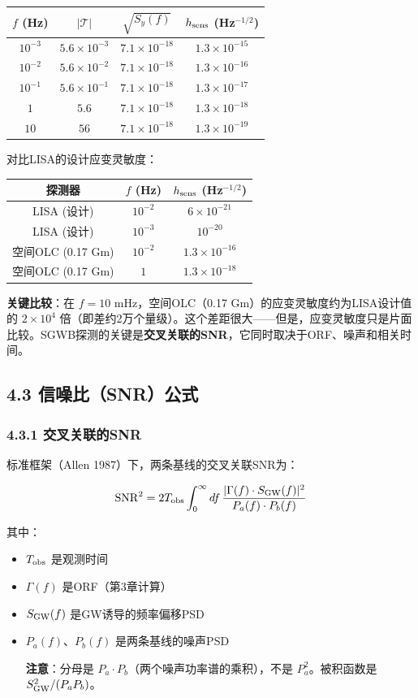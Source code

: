 \documentclass[12pt,a4paper]{article}
\begin{document}
\begin{tabular}{|c|c|c|c|}
\hline
$f$ (Hz) & $|\mathcal{T}|$ & $\sqrt{S_y(f)}$ & $h_{\rm sens}$ (Hz$^{-1/2}$) \\
\hline
$10^{-3}$ & $5.6 \times 10^{-3}$ & $7.1 \times 10^{-18}$ & $1.3 \times 10^{-15}$ \\
$10^{-2}$ & $5.6 \times 10^{-2}$ & $7.1 \times 10^{-18}$ & $1.3 \times 10^{-16}$ \\
$10^{-1}$ & $5.6 \times 10^{-1}$ & $7.1 \times 10^{-18}$ & $1.3 \times 10^{-17}$ \\
$1$ & $5.6$ & $7.1 \times 10^{-18}$ & $1.3 \times 10^{-18}$ \\
$10$ & $56$ & $7.1 \times 10^{-18}$ & $1.3 \times 10^{-19}$ \\
\hline
\end{tabular}


对比LISA的设计应变灵敏度：

\begin{tabular}{|c|c|c|}
\hline
探测器 & $f$ (Hz) & $h_{\rm sens}$ (Hz$^{-1/2}$) \\
\hline
LISA (设计) & $10^{-2}$ & $6 \times 10^{-21}$ \\
LISA (设计) & $10^{-3}$ & $10^{-20}$ \\
空间OLC (0.17 Gm) & $10^{-2}$ & $1.3 \times 10^{-16}$ \\
空间OLC (0.17 Gm) & $1$ & $1.3 \times 10^{-18}$ \\
\hline
\end{tabular}


\textbf{关键比较}：在 $f = 10$ mHz，空间OLC（0.17 Gm）的应变灵敏度约为LISA设计值的 $2 \times 10^4$ 倍（即差约2万个量级）。这个差距很大——但是，应变灵敏度只是片面比较。SGWB探测的关键是\textbf{交叉关联的SNR}，它同时取决于ORF、噪声和相关时间。

\subsection{4.3 信噪比（SNR）公式}


\subsubsection{4.3.1 交叉关联的SNR}


标准框架（Allen 1987）下，两条基线的交叉关联SNR为：

$${\rm SNR}^2 = 2 T_{\rm obs} \int_0^\infty df\, \frac{|\Gamma(f) \cdot S_{\rm GW}(f)|^2}{P_a(f) \cdot P_b(f)}$$

其中：
\begin{itemize}
  \item $T_{\rm obs}$ 是观测时间
  \item $\Gamma(f)$ 是ORF（第3章计算）
  \item $S_{\rm GW}(f)$ 是GW诱导的频率偏移PSD
  \item $P_a(f)$、$P_b(f)$ 是两条基线的噪声PSD

\textbf{注意}：分母是 $P_a \cdot P_b$（两个噪声功率谱的乘积），不是 $P_a^2$。被积函数是 $S_{\rm GW}^2 / (P_a P_b)$。

\end{itemize}
\end{document}
